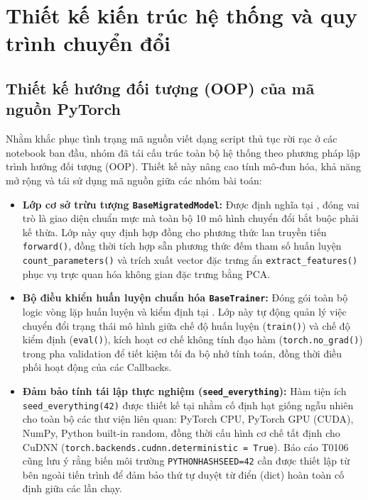 \chapter{Thiết kế kiến trúc hệ thống và quy trình chuyển đổi}

\section{Thiết kế hướng đối tượng (OOP) của mã nguồn PyTorch}
Nhằm khắc phục tình trạng mã nguồn viết dạng script thủ tục rời rạc ở các notebook ban đầu, nhóm đã tái cấu trúc toàn bộ hệ thống theo phương pháp lập trình hướng đối tượng (OOP). Thiết kế này nâng cao tính mô-đun hóa, khả năng mở rộng và tái sử dụng mã nguồn giữa các nhóm bài toán:

\begin{itemize}
\item \textbf{Lớp cơ sở trừu tượng \texttt{BaseMigratedModel}:} Được định nghĩa tại , đóng vai trò là giao diện chuẩn mực mà toàn bộ 10 mô hình chuyển đổi bắt buộc phải kế thừa. Lớp này quy định hợp đồng cho phương thức lan truyền tiến \texttt{forward()}, đồng thời tích hợp sẵn phương thức đếm tham số huấn luyện \texttt{count\_parameters()} và trích xuất vector đặc trưng ẩn \texttt{extract\_features()} phục vụ trực quan hóa không gian đặc trưng bằng PCA.

\item \textbf{Bộ điều khiển huấn luyện chuẩn hóa \texttt{BaseTrainer}:} Đóng gói toàn bộ logic vòng lặp huấn luyện và kiểm định tại . Lớp này tự động quản lý việc chuyển đổi trạng thái mô hình giữa chế độ huấn luyện (\texttt{train()}) và chế độ kiểm định (\texttt{eval()}), kích hoạt cơ chế không tính đạo hàm (\texttt{torch.no\_grad()}) trong pha validation để tiết kiệm tối đa bộ nhớ tính toán, đồng thời điều phối hoạt động của các Callbacks.

\item \textbf{Đảm bảo tính tái lập thực nghiệm (\texttt{seed\_everything}):} Hàm tiện ích \texttt{seed\_everything(42)} được thiết kế tại  nhằm cố định hạt giống ngẫu nhiên cho toàn bộ các thư viện liên quan: PyTorch CPU, PyTorch GPU (CUDA), NumPy, Python built-in random, đồng thời cấu hình cơ chế tất định cho CuDNN (\texttt{torch.backends.cudnn.deterministic = True}). Báo cáo T0106 cũng lưu ý rằng biến môi trường \texttt{PYTHONHASHSEED=42} cần được thiết lập từ bên ngoài tiến trình để đảm bảo thứ tự duyệt từ điển (dict) hoàn toàn cố định giữa các lần chạy.


\end{itemize}
